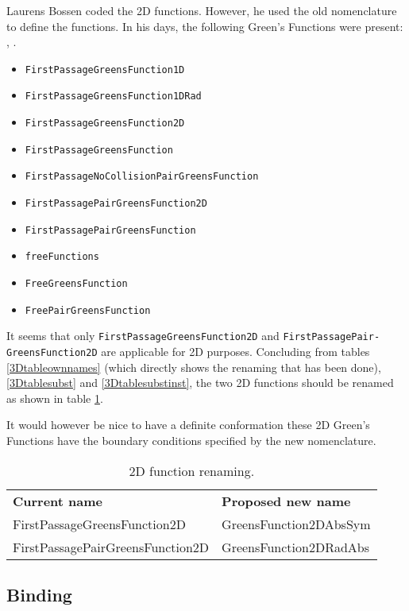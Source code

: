 \documentclass[a4paper,10pt]{article}
\begin{document}
Laurens Bossen coded the 2D functions. However, he used the old nomenclature to define the functions. In his days, the following Green's Functions were present: , .
\begin{itemize}
 \item \texttt{FirstPassageGreensFunction1D}
 \item \texttt{FirstPassageGreensFunction1DRad} 
 \item \texttt{FirstPassageGreensFunction2D}
 \item \texttt{FirstPassageGreensFunction}
 \item \texttt{FirstPassageNoCollisionPairGreensFunction}
 \item \texttt{FirstPassagePairGreensFunction2D}
 \item \texttt{FirstPassagePairGreensFunction}
 \item \texttt{freeFunctions}
 \item \texttt{FreeGreensFunction}
 \item \texttt{FreePairGreensFunction}
\end{itemize}

It seems that only \texttt{FirstPassageGreensFunction2D} and \texttt{FirstPassagePair\hyp{}GreensFunction2D} are applicable for 2D purposes. Concluding from tables \ref{3Dtableownnames} (which directly shows the renaming that has been done), \ref{3Dtablesubst} and \ref{3Dtablesubstinst}, the two 2D functions should be renamed as shown in table \ref{table:2Drenaming}.

It would however be nice to have a definite conformation these 2D Green's Functions have the boundary conditions specified by the new nomenclature.

\begin{table}[h!]
\caption{2D function renaming.}
\label{table:2Drenaming}
\begin{tabular}{ p{} p{} }
  \textbf{Current name} & \textbf{Proposed new name} \\
  FirstPassageGreensFunction2D & GreensFunction2DAbsSym \\
  FirstPassagePairGreensFunction2D & GreensFunction2DRadAbs\\
\end{tabular}
\end{table}

\subsection{Binding}
\end{document}
